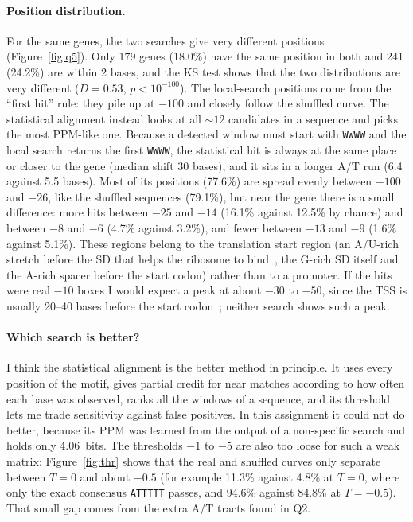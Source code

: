 \documentclass[11pt,a4paper]{article}
\newcommand{\seqs}[1]{\texttt{#1}}
\begin{document}
\paragraph{Position distribution.}
For the same genes, the two searches give very different positions (Figure~\ref{fig:q5}). Only 179
genes (18.0\%) have the same position in both and 241 (24.2\%) are within 2 bases, and the KS test
shows that the two distributions are very different ($D=0.53$, $p<10^{-100}$). The local-search
positions come from the ``first hit'' rule: they pile up at $-100$ and closely follow the shuffled
curve. The statistical alignment instead looks at all ${\sim}12$ candidates in a sequence and picks
the most PPM-like one. Because a detected window must start with \seqs{WWWW} and the local search
returns the first \seqs{WWWW}, the statistical hit is always at the same place or closer to the gene
(median shift 30 bases), and it sits in a longer A/T run (6.4 against 5.5 bases). Most of its
positions (77.6\%) are spread evenly between $-100$ and $-26$, like the shuffled sequences (79.1\%),
but near the gene there is a small difference: more hits between $-25$ and $-14$ (16.1\% against
12.5\% by chance) and between $-8$ and $-6$ (4.7\% against 3.2\%), and fewer between $-13$ and $-9$
(1.6\% against 5.1\%). These regions belong to the translation start region (an A/U-rich stretch
before the SD that helps the ribosome to bind~\cite{boni}, the G-rich SD itself and the A-rich spacer
before the start codon) rather than to a promoter. If the hits were real $-10$ boxes I would expect a
peak at about $-30$ to $-50$, since the TSS is usually 20--40 bases before the start
codon~\cite{mendoza}; neither search shows such a peak.

\paragraph{Which search is better?}
I think the statistical alignment is the better method in principle. It uses every position of the
motif, gives partial credit for near matches according to how often each base was observed, ranks
all the windows of a sequence, and its threshold lets me trade sensitivity against false positives.
In this assignment it could not do better, because its PPM was learned from the output of a
non-specific search and holds only 4.06~bits. The thresholds $-1$ to $-5$ are also too loose for
such a weak matrix: Figure~\ref{fig:thr} shows that the real and shuffled curves only separate
between $T=0$ and about $-0.5$ (for example 11.3\% against 4.8\% at $T=0$, where only the exact
consensus \seqs{ATTTTT} passes, and 94.6\% against 84.8\% at $T=-0.5$). That small gap comes from
the extra A/T tracts found in Q2.
\end{document}
